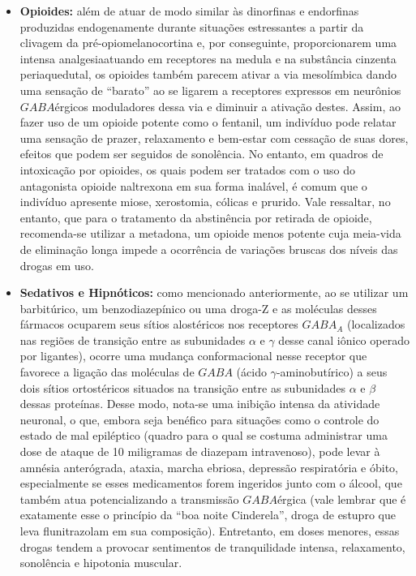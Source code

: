 \documentclass[
]{book}
\begin{document}
\begin{itemize}
\item
  \textbf{Opioides:} além de atuar de modo similar às dinorfinas e endorfinas produzidas endogenamente durante situações estressantes a partir da clivagem da pré-opiomelanocortina e, por conseguinte, proporcionarem uma intensa analgesiaatuando em receptores na medula e na substância cinzenta periaquedutal, os opioides também parecem ativar a via mesolímbica dando uma sensação de ``barato'' ao se ligarem a receptores expressos em neurônios \(GABA\)érgicos moduladores dessa via e diminuir a ativação destes. Assim, ao fazer uso de um opioide potente como o fentanil, um indivíduo pode relatar uma sensação de prazer, relaxamento e bem-estar com cessação de suas dores, efeitos que podem ser seguidos de sonolência. No entanto, em quadros de intoxicação por opioides, os quais podem ser tratados com o uso do antagonista opioide naltrexona em sua forma inalável, é comum que o indivíduo apresente miose, xerostomia, cólicas e prurido. Vale ressaltar, no entanto, que para o tratamento da abstinência por retirada de opioide, recomenda-se utilizar a metadona, um opioide menos potente cuja meia-vida de eliminação longa impede a ocorrência de variações bruscas dos níveis das drogas em uso.
\item
  \textbf{Sedativos e Hipnóticos:} como mencionado anteriormente, ao se utilizar um barbitúrico, um benzodiazepínico ou uma droga-Z e as moléculas desses fármacos ocuparem seus sítios alostéricos nos receptores \(GABA_A\) (localizados nas regiões de transição entre as subunidades \(\alpha\) e \(\gamma\) desse canal iônico operado por ligantes), ocorre uma mudança conformacional nesse receptor que favorece a ligação das moléculas de \(GABA\) (ácido \(\gamma\)-aminobutírico) a seus dois sítios ortostéricos situados na transição entre as subunidades \(\alpha\) e \(\beta\) dessas proteínas. Desse modo, nota-se uma inibição intensa da atividade neuronal, o que, embora seja benéfico para situações como o controle do estado de mal epiléptico (quadro para o qual se costuma administrar uma dose de ataque de 10 miligramas de diazepam intravenoso), pode levar à amnésia anterógrada, ataxia, marcha ebriosa, depressão respiratória e óbito, especialmente se esses medicamentos forem ingeridos junto com o álcool, que também atua potencializando a transmissão \(GABA\)érgica (vale lembrar que é exatamente esse o princípio da ``boa noite Cinderela'', droga de estupro que leva flunitrazolam em sua composição). Entretanto, em doses menores, essas drogas tendem a provocar sentimentos de tranquilidade intensa, relaxamento, sonolência e hipotonia muscular.

\end{itemize}
\end{document}

